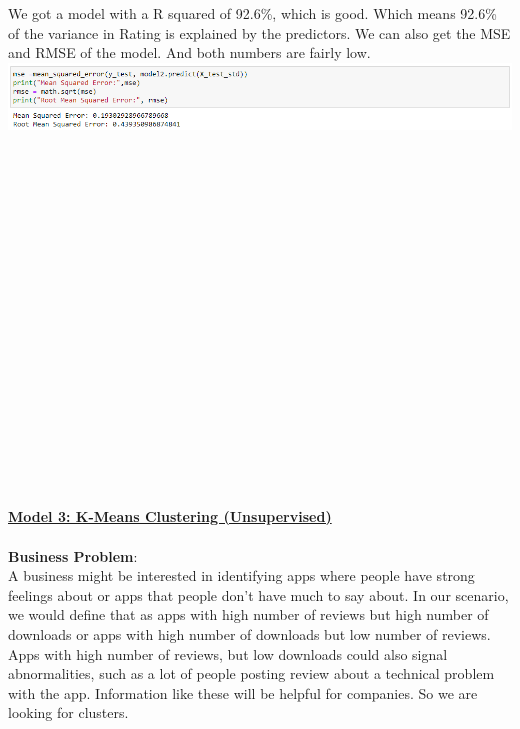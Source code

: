 \documentclass[11pt]{article}
\begin{document}
We got a model with a R squared of 92.6\%, which is good. Which means 92.6\% of the variance in Rating is explained by the predictors. We can also get the MSE and RMSE of the model. And both numbers are fairly low. \\ 
\includegraphics[scale=0.65]{rmse} \\  \\ \\ \\ \\ \\ \\ \\ \\ \\ \\ \\ \\ \\ \\ \\ \\ \\ \\ \\

\underline{\textbf{Model 3: K-Means Clustering (Unsupervised)}}\\ \\
\textbf{Business Problem}: \\
A business might be interested in identifying apps where people have strong feelings about or apps that people don't have much to say about. In our scenario, we would define that as apps with high number of reviews but high number of downloads or apps with high number of downloads but low number of reviews. Apps with high number of reviews, but low downloads could also signal abnormalities, such as a lot of people posting review about a technical problem with the app. Information like these will be helpful for companies. So we are looking for clusters.  \\ 
\end{document}
